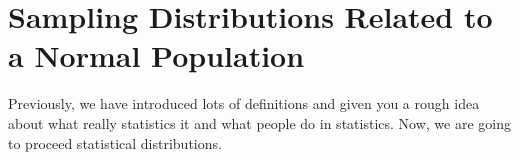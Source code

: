 \chapter{Sampling Distributions Related to a Normal Population}
\label{sec.matrix}
\pagestyle{myheadings}  

Previously, we have introduced lots of definitions and given you a rough idea about what really statistics it and what people do in statistics. Now, we are going to proceed statistical distributions. 



